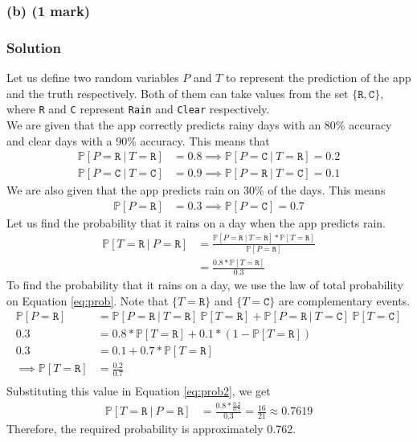 \documentclass[12pt]{article}
\begin{document}
    \subsubsection*{(b) (1 mark)}
    \subsubsection*{Solution}
    Let us define two random variables $P$ and $T$ to represent the prediction
    of the app and the truth respectively. Both of them can take values from
    the set $\{ \texttt{R}, \texttt{C} \}$, where \texttt{R} and \texttt{C}
    represent \texttt{Rain} and \texttt{Clear} respectively. \\
    We are given that the app correctly predicts rainy days with an 80\% accuracy
    and clear days with a 90\% accuracy. This means that
    \begin{align}
        \mathbb{P}[P = \texttt{R} \ | \ T = \texttt{R}] &= 0.8 \implies \mathbb{P}[P = \texttt{C} \ | \ T = \texttt{R}] = 0.2 \\
        \mathbb{P}[P = \texttt{C} \ | \ T = \texttt{C}] &= 0.9 \implies \mathbb{P}[P = \texttt{R} \ | \ T = \texttt{C}] = 0.1
    \end{align}
    We are also given that the app predicts rain on 30\% of the days. This means
    \begin{align}
        \label{eq:prob}
        \mathbb{P}[P = \texttt{R}] &= 0.3 \implies \mathbb{P}[P = \texttt{C}] = 0.7
    \end{align}
    Let us find the probability that it rains on a day when the app predicts rain.
    \begin{align}
        \mathbb{P}[T = \texttt{R} \ | \ P = \texttt{R}] &= \frac{\mathbb{P}[P = \texttt{R} \ | \ T = \texttt{R}] * \mathbb{P}[T = \texttt{R}]}{\mathbb{P}[P = \texttt{R}]} \\
        \label{eq:prob2}
        &= \frac{0.8 * \mathbb{P}[T = \texttt{R}]}{0.3}
    \end{align}
    To find the probability that it rains on a day, we use the law of total probability
    on Equation \eqref{eq:prob}. Note that $\{ T = \texttt{R} \}$ and $\{ T = \texttt{C} \}$ are
    complementary events.
    \begin{align}
        \mathbb{P}[P = \texttt{R}] &= \mathbb{P}[P = \texttt{R} \ | \ T = \texttt{R}] \ \mathbb{P}[T = \texttt{R}] + \mathbb{P}[P = \texttt{R} \ | \ T = \texttt{C}] \ \mathbb{P}[T = \texttt{C}] \\
        0.3 &= 0.8 * \mathbb{P}[T = \texttt{R}] + 0.1 * (1 - \mathbb{P}[T = \texttt{R}]) \\
        0.3 &= 0.1 + 0.7 * \mathbb{P}[T = \texttt{R}] \\
        \implies \mathbb{P}[T = \texttt{R}] &= \frac{0.2}{0.7} \\
    \end{align}
    Substituting this value in Equation \eqref{eq:prob2}, we get
    \begin{align}
        \mathbb{P}[T = \texttt{R} \ | \ P = \texttt{R}] &= \frac{0.8 * \frac{0.2}{0.7}}{0.3} = \frac{16}{21} \approx 0.7619
    \end{align}
    Therefore, the required probability is approximately 0.762.
\end{document}
